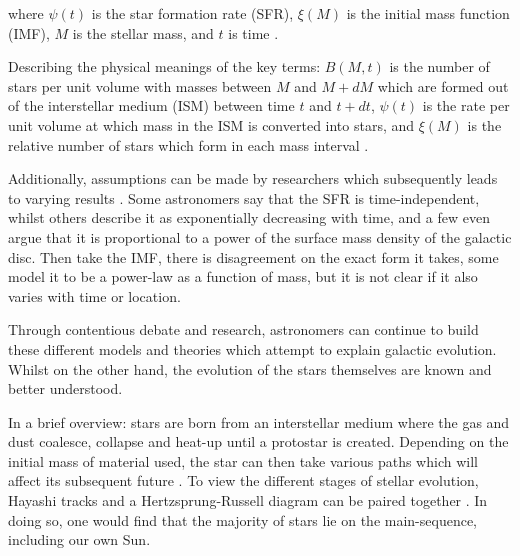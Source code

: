 \documentclass[12pt, twocolumn]{revtex4}    %
\begin{document}
where $\psi(t)$ is the star formation rate (SFR), $\xi (M)$ is the initial mass function (IMF), $M$ is the stellar mass, and $t$ is time \citep{carroll_astro}. 

Describing the physical meanings of the key terms: $B(M,t)$ is the number of stars per unit volume with masses between $M$ and $M+dM$ which are formed out of the interstellar medium (ISM) between time $t$ and $t+dt$, $\psi(t)$ is the rate per unit volume at which mass in the ISM is converted into stars, and $\xi(M)$ is the relative number of stars which form in each mass interval \citep{carroll_astro}. 

Additionally, assumptions can be made by researchers which subsequently leads to varying results \citep{carroll_astro}. Some astronomers say that the SFR is time-independent, whilst others describe it as exponentially decreasing with time, and a few even argue that it is proportional to a power of the surface mass density of the galactic disc. Then take the IMF, there is disagreement on the exact form it takes, some model it to be a power-law as a function of mass, but it is not clear if it also varies with time or location.

Through contentious debate and research, astronomers can continue to build these different models and theories which attempt to explain galactic evolution. Whilst on the other hand, the evolution of the stars themselves are known and better understood. 

In a brief overview: stars are born from an interstellar medium where the gas and dust coalesce, collapse and heat-up until a protostar is created. Depending on the initial mass of material used, the star can then take various paths which will affect its subsequent future \citep{mccoy_space_sciences}. To view the different stages of stellar evolution, Hayashi tracks and a Hertzsprung-Russell diagram can be paired together \citep{carroll_astro}. In doing so, one would find that the majority of stars lie on the main-sequence, including our own Sun.  
\end{document}
